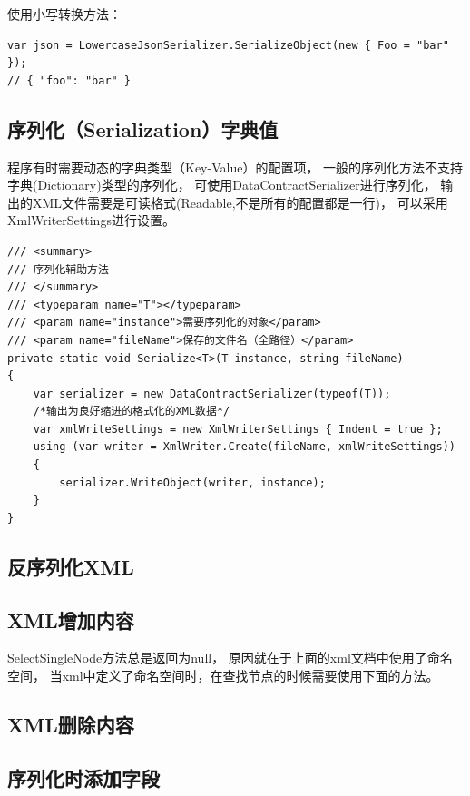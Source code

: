\documentclass{book}
\begin{document}
使用小写转换方法：

\begin{lstlisting}[language={[Sharp]C},caption=转换实例]
var json = LowercaseJsonSerializer.SerializeObject(new { Foo = "bar" });
// { "foo": "bar" }
\end{lstlisting}

\subsection{序列化（Serialization）字典值}

程序有时需要动态的字典类型（Key-Value）的配置项，
一般的序列化方法不支持字典(Dictionary)类型的序列化，
可使用DataContractSerializer进行序列化，
输出的XML文件需要是可读格式(Readable,不是所有的配置都是一行)，
可以采用XmlWriterSettings进行设置。

\begin{lstlisting}[language={[Sharp]C},caption=将字典序列化为XML文件]
/// <summary>
/// 序列化辅助方法
/// </summary>
/// <typeparam name="T"></typeparam>
/// <param name="instance">需要序列化的对象</param>
/// <param name="fileName">保存的文件名（全路径）</param>
private static void Serialize<T>(T instance, string fileName)
{
    var serializer = new DataContractSerializer(typeof(T));
    /*输出为良好缩进的格式化的XML数据*/
    var xmlWriteSettings = new XmlWriterSettings { Indent = true };
    using (var writer = XmlWriter.Create(fileName, xmlWriteSettings))
    {
        serializer.WriteObject(writer, instance);
    }
}
\end{lstlisting}

\subsection{反序列化XML}

\subsection{XML增加内容}

SelectSingleNode方法总是返回为null，
原因就在于上面的xml文档中使用了命名空间，
当xml中定义了命名空间时，在查找节点的时候需要使用下面的方法。



\subsection{XML删除内容}

\subsection{序列化时添加字段}
\end{document}
